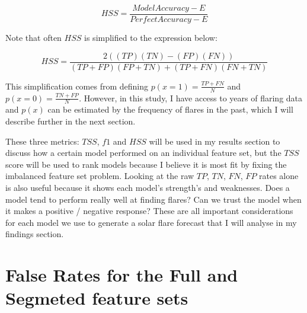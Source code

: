 \documentclass[defaultstyle,11pt]{thesis}
\begin{document}
$$HSS = \frac{Model Accuracy - E}{Perfect Accuracy - E}$$

Note that often $HSS$ is simplified to the expression below:

$$HSS = \frac{2((TP)(TN)-(FP)(FN))}{(TP + FP)(FP + TN) + (TP + FN)(FN + TN)}$$

This simplification comes from defining $p(x = 1) = \frac{TP + FN}{N}$ and $p(x = 0) = \frac{TN + FP}{N}$. However, in this study, I have access to years of flaring data and $p(x)$ can be estimated by the frequency of flares in the past, which I will describe further in the next section.

These three metrics: $TSS$, $f1$ and $HSS$ will be used in my results section to discuss how a certain model performed on an individual feature set, but the $TSS$ score will be used to rank models because I believe it is most fit by fixing the imbalanced feature set problem. Looking at the raw $TP$, $TN$, $FN$, $FP$ rates alone is also useful because it shows each model's strength's and weaknesses. Does a model tend to perform really well at finding flares? Can we trust the model when it makes a positive / negative response? These are all important considerations for each model we use to generate a solar flare forecast that I will analyse in my findings section.


\chapter{False Rates for the Full and Segmeted feature sets}
\label{appendix:fprfnrother}
\end{document}
